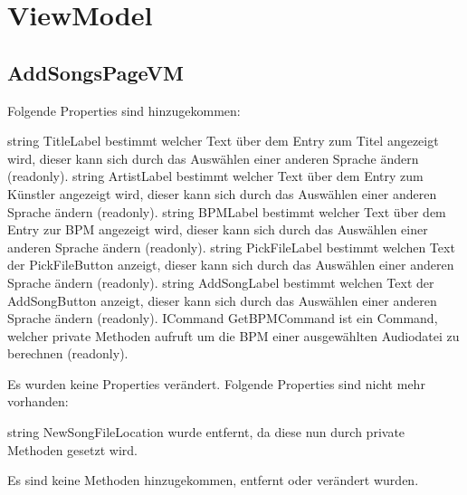 \documentclass[../implementierung.tex]{subfiles}
\begin{document}
	\section{ViewModel}
		\subsection{AddSongsPageVM}
			Folgende Properties sind hinzugekommen:
			\begin{itemize}
				\add string TitleLabel bestimmt welcher Text über dem Entry zum Titel angezeigt wird, dieser kann sich durch das Auswählen einer anderen Sprache ändern (readonly).
				\add string ArtistLabel bestimmt welcher Text über dem Entry zum Künstler angezeigt wird, dieser kann sich durch das Auswählen einer anderen Sprache ändern (readonly).
				\add string BPMLabel bestimmt welcher Text über dem Entry zur BPM angezeigt wird, dieser kann sich durch das Auswählen einer anderen Sprache ändern (readonly).
				\add string PickFileLabel bestimmt welchen Text der PickFileButton anzeigt, dieser kann sich durch das Auswählen einer anderen Sprache ändern (readonly).
				\add string AddSongLabel bestimmt welchen Text der AddSongButton anzeigt, dieser kann sich durch das Auswählen einer anderen Sprache ändern (readonly).
				\add ICommand GetBPMCommand ist ein Command, welcher private Methoden aufruft um die BPM einer ausgewählten Audiodatei zu berechnen (readonly).
			\end{itemize}
			Es wurden keine Properties verändert. \newline
			Folgende Properties sind nicht mehr vorhanden:
			\begin{itemize}
				\remove string NewSongFileLocation wurde entfernt, da diese nun durch private Methoden gesetzt wird.
			\end{itemize}
			Es sind keine Methoden hinzugekommen, entfernt oder verändert wurden.
\end{document}
